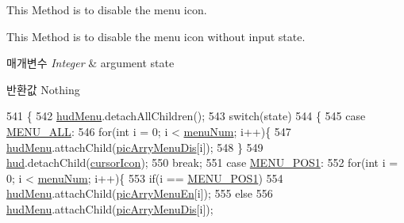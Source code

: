 This Method is to disable the menu icon. 

This Method is to disable the menu icon without input state. 
\begin{DoxyParams}{매개변수}
{\em Integer} & argument state \\
\hline
\end{DoxyParams}
\begin{DoxyReturn}{반환값}
Nothing 
\end{DoxyReturn}

\begin{DoxyCode}
541   \{
542     \hyperlink{classkr_1_1ac_1_1kookmin_1_1cs_1_1hud_1_1_h_u_d_management_a42b564e79a47075337594ae2a83f4309}{hudMenu}.detachAllChildren();
543     \textcolor{keywordflow}{switch}(state)
544     \{
545       \textcolor{keywordflow}{case} \hyperlink{classkr_1_1ac_1_1kookmin_1_1cs_1_1hud_1_1_h_u_d_management_aea6d53b87b47693e0d365f8cd6fba75f}{MENU\_ALL}:
546         \textcolor{keywordflow}{for}(\textcolor{keywordtype}{int} i = 0; i < \hyperlink{classkr_1_1ac_1_1kookmin_1_1cs_1_1hud_1_1_h_u_d_management_af69baaadf8bdb8b4f429269357fb84d9}{menuNum}; i++)\{
547           \hyperlink{classkr_1_1ac_1_1kookmin_1_1cs_1_1hud_1_1_h_u_d_management_a42b564e79a47075337594ae2a83f4309}{hudMenu}.attachChild(\hyperlink{classkr_1_1ac_1_1kookmin_1_1cs_1_1hud_1_1_h_u_d_management_ab5d064aafc8e948ecd818cfec7acbb3c}{picArryMenuDis}[i]);
548         \}
549         \hyperlink{classkr_1_1ac_1_1kookmin_1_1cs_1_1hud_1_1_h_u_d_management_a4c4a440b9bdbbe24eb50ee79826aee53}{hud}.detachChild(\hyperlink{classkr_1_1ac_1_1kookmin_1_1cs_1_1hud_1_1_h_u_d_management_a8bd64fe62e6e91c9bd83a274eb59faa9}{cursorIcon});
550         \textcolor{keywordflow}{break};
551       \textcolor{keywordflow}{case} \hyperlink{classkr_1_1ac_1_1kookmin_1_1cs_1_1hud_1_1_h_u_d_management_a3945824c1d285a532b81075debe3a8cf}{MENU\_POS1}:
552         \textcolor{keywordflow}{for}(\textcolor{keywordtype}{int} i = 0; i < \hyperlink{classkr_1_1ac_1_1kookmin_1_1cs_1_1hud_1_1_h_u_d_management_af69baaadf8bdb8b4f429269357fb84d9}{menuNum}; i++)\{
553           \textcolor{keywordflow}{if}(i == \hyperlink{classkr_1_1ac_1_1kookmin_1_1cs_1_1hud_1_1_h_u_d_management_a3945824c1d285a532b81075debe3a8cf}{MENU\_POS1})
554             \hyperlink{classkr_1_1ac_1_1kookmin_1_1cs_1_1hud_1_1_h_u_d_management_a42b564e79a47075337594ae2a83f4309}{hudMenu}.attachChild(\hyperlink{classkr_1_1ac_1_1kookmin_1_1cs_1_1hud_1_1_h_u_d_management_accf7a9ec5092e5872460755f3b81d6d5}{picArryMenuEn}[i]);
555           \textcolor{keywordflow}{else}
556             \hyperlink{classkr_1_1ac_1_1kookmin_1_1cs_1_1hud_1_1_h_u_d_management_a42b564e79a47075337594ae2a83f4309}{hudMenu}.attachChild(\hyperlink{classkr_1_1ac_1_1kookmin_1_1cs_1_1hud_1_1_h_u_d_management_ab5d064aafc8e948ecd818cfec7acbb3c}{picArryMenuDis}[i]);

\end{DoxyCode}

